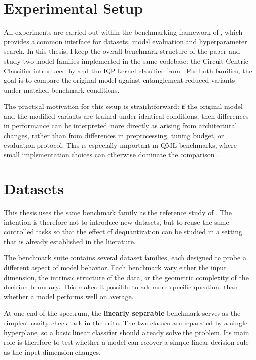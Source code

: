 \documentclass[12pt,a4paper,openany]{report}
\let\parencite\citep
\let\textcite\citet
\begin{document}
\section{Experimental Setup}

All experiments are carried out within the benchmarking framework of \textcite{bowles2024better}, which provides a common interface for datasets, model evaluation and hyperparameter search. In this thesis, I keep the overall benchmark structure of the paper and study two model families implemented in the same codebase: the Circuit-Centric Classifier introduced by \textcite{schuld2018circuit} and the IQP kernel classifier from \textcite{havlicek2019supervised}. For both families, the goal is to compare the original model against entanglement-reduced variants under matched benchmark conditions.

The practical motivation for this setup is straightforward: if the original model and the modified variants are trained under identical conditions, then differences in performance can be interpreted more directly as arising from architectural changes, rather than from differences in preprocessing, tuning budget, or evaluation protocol. This is especially important in QML benchmarks, where small implementation choices can otherwise dominate the comparison \parencite{bowles2024better}.

\section{Datasets}

This thesis uses the same benchmark family as the reference study of \textcite{bowles2024better}. The intention is therefore not to introduce new datasets, but to reuse the same controlled tasks so that the effect of dequantization can be studied in a setting that is already established in the literature.



The benchmark suite contains several dataset families, each designed to probe a different aspect of model behavior. Each benchmark vary either the input dimension, the intrinsic structure of the data, or the geometric complexity of the decision boundary. This makes it possible to ask more specific questions than whether a model performs well on average.

At one end of the spectrum, the \textbf{linearly separable} benchmark serves as the simplest sanity-check task in the suite. The two classes are separated by a single hyperplane, so a basic linear classifier should already solve the problem. Its main role is therefore to test whether a model can recover a simple linear decision rule as the input dimension changes.
\end{document}
